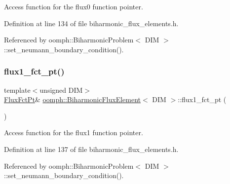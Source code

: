 Access function for the flux0 function pointer. 



Definition at line 134 of file biharmonic\+\_\+flux\+\_\+elements.\+h.



Referenced by oomph\+::\+Biharmonic\+Problem$<$ D\+I\+M $>$\+::set\+\_\+neumann\+\_\+boundary\+\_\+condition().

\mbox{\label{classoomph_1_1BiharmonicFluxElement_a9bb55fe653d5690cc7e53ae8385a8264}} 
\subsubsection{\texorpdfstring{flux1\+\_\+fct\+\_\+pt()}{flux1\_fct\_pt()}}
{\footnotesize\ttfamily template$<$unsigned D\+IM$>$ \\
\hyperlink{classoomph_1_1BiharmonicFluxElement_a0fafeac48951b37cf5cd86aa486945a8}{Flux\+Fct\+Pt}\& \hyperlink{classoomph_1_1BiharmonicFluxElement}{oomph\+::\+Biharmonic\+Flux\+Element}$<$ D\+IM $>$\+::flux1\+\_\+fct\+\_\+pt (\begin{DoxyParamCaption}{ }\end{DoxyParamCaption})\hspace{0.3cm}{\ttfamily [inline]}}



Access function for the flux1 function pointer. 



Definition at line 137 of file biharmonic\+\_\+flux\+\_\+elements.\+h.



Referenced by oomph\+::\+Biharmonic\+Problem$<$ D\+I\+M $>$\+::set\+\_\+neumann\+\_\+boundary\+\_\+condition().

\mbox{\label{classoomph_1_1BiharmonicFluxElement_abe29aa7bcd5a053137fc0aed535502ee}} 
